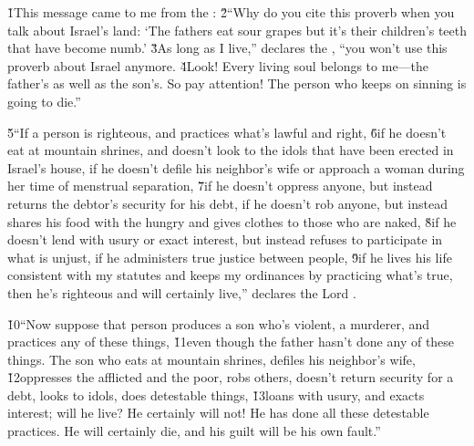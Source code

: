 \v{1}This message came to me from the : \v{2}``Why do you cite this proverb when you talk about Israel's land: `The fathers eat sour grapes but it's their children's teeth that have become numb.' \v{3}As long as I live,'' declares the , ``you won't use this proverb about Israel anymore. \v{4}Look! Every living soul belongs to me---the father's as well as the son's. So pay attention! The person who keeps on sinning is going to die.''

\v{5}``If a person is righteous, and practices what's lawful and right, \v{6}if he doesn't eat at mountain shrines, and doesn't look to the idols that have been erected in Israel's house, if he doesn't defile his neighbor's wife or approach a woman during her time of menstrual separation, \v{7}if he doesn't oppress anyone, but instead returns the debtor's security for his debt, if he doesn't rob anyone, but instead shares his food with the hungry and gives clothes to those who are naked, \v{8}if he doesn't lend with usury or exact interest, but instead refuses to participate in what is unjust, if he administers true justice between people, \v{9}if he lives his life consistent with my statutes and keeps my ordinances by practicing what's true, then he's righteous and will certainly live,'' declares the Lord .

\v{10}``Now suppose that person produces a son who's violent, a murderer, and practices any of these things, \v{11}even though the father hasn't done any of these things. The son who eats at mountain shrines, defiles his neighbor's wife, \v{12}oppresses the afflicted and the poor, robs others, doesn't return security for a debt, looks to idols, does detestable things, \v{13}loans with usury, and exacts interest; will he live? He certainly will not! He has done all these detestable practices. He will certainly die, and his guilt will be his own fault.''

